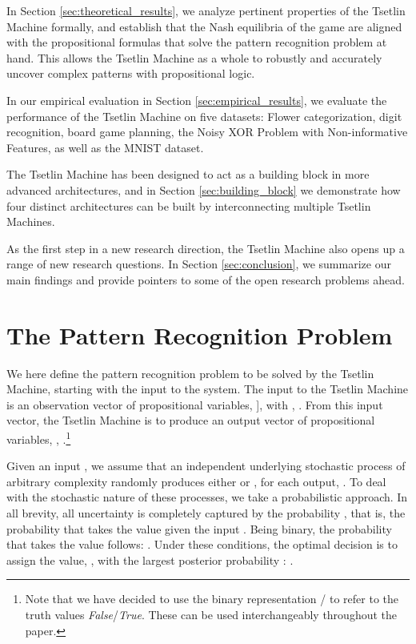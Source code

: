 \documentclass[11pt,a4paper]{article}
\begin{document}
In Section \ref{sec:theoretical_results}, we analyze pertinent properties of the Tsetlin Machine formally, and establish that the Nash equilibria of the game are aligned with the propositional formulas that solve the pattern recognition problem at hand. This allows the Tsetlin Machine as a whole to robustly and accurately uncover complex patterns with propositional logic.

In our empirical evaluation in Section \ref{sec:empirical_results}, we evaluate the performance of the Tsetlin Machine on five datasets: Flower categorization, digit recognition, board game planning, the Noisy XOR Problem with Non-informative Features, as well as the MNIST dataset.

The Tsetlin Machine has been designed to act as a building block in more advanced architectures, and in Section \ref{sec:building_block} we demonstrate how four distinct architectures can be built by interconnecting multiple Tsetlin Machines.

As the first step in a new research direction, the Tsetlin Machine also opens up a range of new research questions. In Section \ref{sec:conclusion}, we summarize our main findings and provide pointers to some of the open research problems ahead.

\section{The Pattern Recognition Problem}
\label{sec:pattern_recognition_problem}

We here define the pattern recognition problem to be solved by the Tsetlin Machine, starting with the input to the system. The input to the Tsetlin Machine is an observation vector of  propositional variables, ], with , . From this input vector, the Tsetlin Machine is to produce an output vector  of  propositional variables, , .\footnote{Note that we have decided to use the binary representation / to refer to the truth values \emph{False}/\emph{True}. These can be used interchangeably throughout the paper.}

Given an input , we assume that an independent underlying stochastic process of arbitrary complexity randomly produces either  or , for each output, . To deal with the stochastic nature of these processes, we take a probabilistic approach. In all brevity, all uncertainty is completely captured by the probability , that is, the probability that  takes the value  given the input . Being binary, the probability that  takes the value  follows: . Under these conditions, the optimal decision is to assign  the value, , with the largest posterior probability \cite{Duda2001}: .
\end{document}
